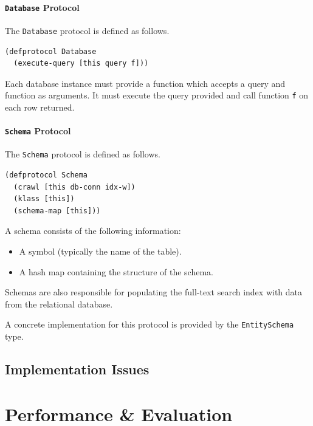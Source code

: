 \documentclass[12pt,letterpaper,oneside,notitlepage]{report}
\theoremstyle{definition}
\begin{document}
        \subsubsection{\texttt{Database} Protocol}
          The \texttt{Database} protocol is defined as follows.
          
          \begin{verbatim}
(defprotocol Database
  (execute-query [this query f]))
          \end{verbatim}
          
          Each database instance must provide a function which accepts a query and function as arguments.  It must execute the query provided and call function \texttt{f} on each row returned.
        
        \subsubsection{\texttt{Schema} Protocol}
          The \texttt{Schema} protocol is defined as follows.
          
          \begin{verbatim}
(defprotocol Schema
  (crawl [this db-conn idx-w])
  (klass [this])
  (schema-map [this]))
          \end{verbatim}
          
          A schema consists of the following information:
          
          \begin{itemize}
            \item A symbol (typically the name of the table).
            \item A hash map containing the structure of the schema.
          \end{itemize}
          
          Schemas are also responsible for populating the full-text search index with data from the relational database.
          
          A concrete implementation for this protocol is provided by the \texttt{EntitySchema} type.
    
    \section{Implementation Issues}
  
  \chapter{Performance \& Evaluation}
\end{document}
